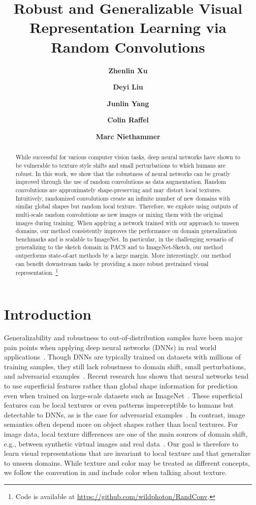 \documentclass{article} \usepackage{iclr2021_conference,times}
\title{Robust and Generalizable Visual Representation Learning via Random Convolutions}
\author[1]{\textbf{Zhenlin Xu}}
\author[1]{\textbf{Deyi Liu}}
\author[2]{\textbf{Junlin Yang}}
\author[1]{\textbf{Colin Raffel}}
\author[1]{\textbf{Marc Niethammer}}
\affil[1]{
University of North Carolina at Chapel Hill }
\affil[2]{
Yale University}
\affil[1]{\footnotesize\texttt{\{zhenlinx, mn, craffel\}@cs.unc.edu, deyi@live.unc.edu}}
\affil[2]{\footnotesize\texttt{junlin.yang@yale.edu}}
\begin{document}
\maketitle

\begin{abstract}
	While successful for various computer vision tasks, deep neural networks have shown to be vulnerable to texture style shifts and small perturbations to which humans are robust. In this work, we show that the robustness of neural networks can be greatly improved through the use of random convolutions as data augmentation. Random convolutions are approximately shape-preserving and may distort local textures. Intuitively, randomized convolutions create an infinite number of new domains with similar global shapes but random local texture. Therefore, we explore using outputs of multi-scale random convolutions as new images or mixing them with the original images during training. When applying a network trained with our approach to unseen domains, our method consistently improves the performance on domain generalization benchmarks and is scalable to ImageNet. In particular, in the challenging scenario of generalizing to the sketch domain in PACS and to ImageNet-Sketch, our method outperforms state-of-art methods by a large margin. More interestingly, our method can benefit downstream tasks by providing a more robust pretrained visual representation. \footnote{Code is available at \url{ https://github.com/wildphoton/RandConv}.}
\end{abstract}


\section{Introduction}
\label{Introduction}

Generalizability and robustness to out-of-distribution samples have been major pain points when applying deep neural networks (DNNs) in real world applications~\citep{volpi2018generalizing}. Though DNNs are typically trained on datasets with millions of training samples, they still lack robustness to domain shift, small perturbations, and adversarial examples~\citep{luo2019taking}.  Recent research has shown that neural networks tend to use superficial features rather than global shape information for prediction even when trained on large-scale datasets such as ImageNet~\citep{geirhos2018imagenettrained}. These superficial features can be local textures or even patterns imperceptible to humans but detectable to DNNs, as is the case for adversarial examples~\citep{ilyas2019adversarial}. In contrast, image semantics often depend more on object shapes rather than local textures. For image data, local texture differences are one of the main sources of domain shift, e.g., between synthetic virtual images and real data~\citep{sun2014virtual}. Our goal is therefore to learn visual representations that are invariant to local texture and that generalize to unseen domains. {While texture and color may be treated as different concepts, we follow the convention in \cite{geirhos2018imagenettrained} and include color when talking about texture.}
\end{document}
